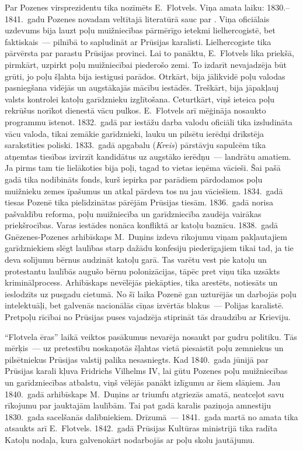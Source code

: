 \documentclass[twoside,a5paper,12pt,fleqn,openany]{extbook}
\newcommand{\detxti}[1]{\textit{\textgerman{#1}}}
\begin{document}
Par Pozenes virsprezidentu tika nozīmēts E.~Flotvels. Viņa amata laiku: 1830.--1841.~gadu Pozenes novadam veltītajā literatūrā sauc par . Viņa oficiālais uzdevums bija lauzt poļu muižniecības pārmērīgo ietekmi lielhercogistē, bet faktiskais~--- pilnībā to sapludināt ar Prūsijas karalisti. Lielhercogiste tika pārvērsta par parastu Prūsijas provinci. Lai to panāktu, E.~Flotvels lika priekšā, pirmkārt, uzpirkt poļu muižniecībai piederošo zemi. To izdarīt nevajadzēja būt grūti, jo poļu šļahta bija iestigusi parādos. Otrkārt, bija jālikvidē poļu valodas pasniegšana vidējās un augstākajās mācību iestādēs. Treškārt, bija jāpakļauj valsts kontrolei katoļu garīdznieku izglītošana. Ceturtkārt, viņš ieteica poļu rekrūšus norīkot dienestā vācu pulkos. E.~Flotvels arī mēģināja nosaukto programmu īstenot. 1832.~gadā par iestāžu darba valodu oficiāli tika izsludināta vācu valoda, tikai zemākie garīdznieki, lauku un pilsētu ierēdņi drīkstēja sarakstīties poliski. 1833.~gadā apgabalu (\detxti{Kreis}) pārstāvju sapulcēm tika atņemtas tiesības izvirzīt kandidātus uz augstāko ierēdņu~--- landrātu amatiem. Ja pirms tam tie lielākoties bija poļi, tagad to vietas ieņēma vācieši. Šai pašā gadā tika nodibināts fonds, kurš iepirka par parādiem pārdodamos poļu muižnieku zemes īpašumus un atkal pārdeva tos nu jau vāciešiem. 1834.~gadā tiesas Pozenē tika pielīdzinātas pārējām Prūsijas tiesām. 1836.~gadā norisa pašvaldību reforma, poļu muižniecība un garīdzniecība zaudēja vairākas priekšrocības. Varas iestādes nonāca konfliktā ar katoļu baznīcu. 1838.~gadā Gnēzenes-Pozenes arhibīskaps M.~Duņins izdeva rīkojumu viņam pakļautajiem garīdzniekiem slēgt laulības starp dažādu konfesiju piederīgajiem tikai tad, ja tie deva solījumu bērnus audzināt katoļu garā. Tas varētu vest pie katoļu un protestantu laulībās augušo bērnu polonizācijas, tāpēc pret viņu tika uzsākts kriminālprocess. Arhibīskaps nevēlējās piekāpties, tika arestēts, notiesāts un ieslodzīts uz pusgadu cietumā. No šī laika Pozenē gan uzturējās un darbojās poļu intelektuāļi, bet galvenās nacionālās cīņas izvērtās blakus~--- Polijas karalistē. Pretpoļu rīcībai no Prūsijas puses vajadzēja stiprināt tās draudzību ar Krieviju.

``Flotvela ēras'' laikā veiktos pasākumus nevarēja nosaukt par gudru politiku. Tās mērķis~--- uz pretestību noskaņotās šļahtas vietā piesaistīt poļu zemniekus un pilsētniekus Prūsijas valstij palika nesasniegts. Kad 1840.~gada jūnijā par Prūsijas karali kļuva Fridrichs Vilhelms IV, lai gūtu Pozenes poļu muižniecības un garīdzniecības atbalstu, viņš vēlējās panākt izlīgumu ar šiem slāņiem. Jau 1840.~gadā arhibīskaps M.~Duņins ar triumfu atgriezās amatā, neatceļot savu rīkojumu par jauktajām laulībām. Tai pat gadā karalis paziņoja amnestiju 1830.~gada sacelšanās dalībniekiem. Drīzumā~--- 1841.~gada martā no amata tika atsaukts arī E.~Flotvels. 1842.~gadā Prūsijas Kultūras ministrijā tika radīta Katoļu nodaļa, kura galvenokārt nodarbojās ar poļu skolu jautājumu.
\end{document}
